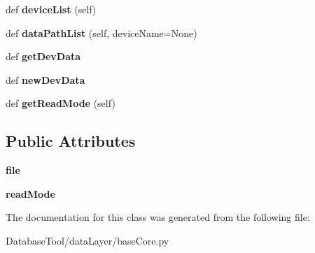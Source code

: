 \begin{DoxyCompactItemize}
def {\bfseries device\+List} (self)
\item 
\mbox{\label{classMIS_1_1DatabaseTool_1_1dataLayer_1_1baseCore_1_1LUMISData_a33b937daac1a1a625cdea33e16567990}} 
def {\bfseries data\+Path\+List} (self, device\+Name=None)
\item 
\mbox{\label{classMIS_1_1DatabaseTool_1_1dataLayer_1_1baseCore_1_1LUMISData_a18353867033aaab7a5bf25ae5f71b6e6}} 
def {\bfseries get\+Dev\+Data}
\item 
\mbox{\label{classMIS_1_1DatabaseTool_1_1dataLayer_1_1baseCore_1_1LUMISData_aa93bfcca2a9e0bf2326b2cb4bbe3058d}} 
def {\bfseries new\+Dev\+Data}
\item 
\mbox{\label{classMIS_1_1DatabaseTool_1_1dataLayer_1_1baseCore_1_1LUMISData_ae469bd13251d8c1a6d85ab1561ece3cd}} 
def {\bfseries get\+Read\+Mode} (self)
\end{DoxyCompactItemize}
\subsection*{Public Attributes}
\begin{DoxyCompactItemize}
\item 
\mbox{\label{classMIS_1_1DatabaseTool_1_1dataLayer_1_1baseCore_1_1LUMISData_ab6a706bd1f85e0223111039d618524b9}} 
{\bfseries file}
\item 
\mbox{\label{classMIS_1_1DatabaseTool_1_1dataLayer_1_1baseCore_1_1LUMISData_a1194ebf8c8a213d0c712d41ecd9fdd3a}} 
{\bfseries read\+Mode}
\end{DoxyCompactItemize}


The documentation for this class was generated from the following file\+:\begin{DoxyCompactItemize}
\item 
Database\+Tool/data\+Layer/base\+Core.\+py\end{DoxyCompactItemize}
